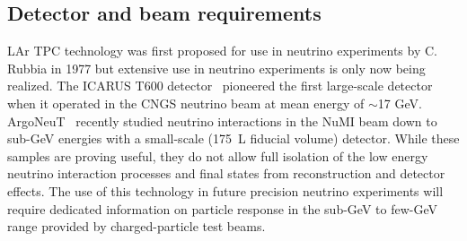 



\subsection{Detector and beam requirements }
\label{detbeam_main}

LAr TPC technology was first proposed for use in neutrino experiments by C. Rubbia in 1977
\cite{CRubbia} but extensive use in neutrino experiments is only now being realized. 
The ICARUS T600 detector~\cite{icarus_mainref} pioneered the first large-scale detector when it operated in the CNGS 
neutrino beam at mean energy of $\sim$17 GeV. ArgoNeuT~\cite{argoneut1}\cite{argoneut2} recently studied 
neutrino interactions in the NuMI beam down to sub-GeV energies with a small-scale (175~L fiducial volume) detector. 
While these samples are proving useful, they do not allow full isolation of
the low energy neutrino interaction processes
and final states from reconstruction and detector effects. 
The use of this technology in future precision neutrino experiments will require dedicated 
information on particle response
in the sub-GeV to few-GeV range provided by charged-particle test beams. 

